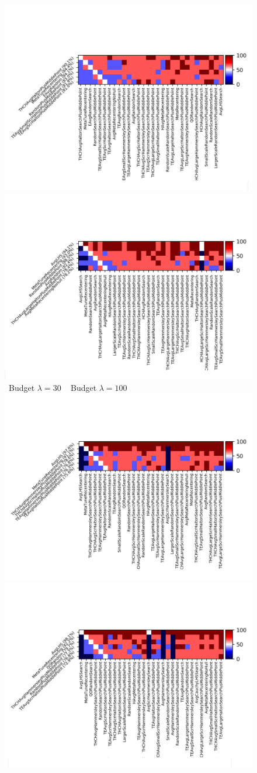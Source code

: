 %
\begin{figure}[t]
    \centering %
\includegraphics[trim={10 20 12 80}, clip,width=.48\textwidth]{sections/appendix/ppsn2020-rescaling/figures/fight_namesphere,budget30.png}
\includegraphics[trim={10 20 12 80}, clip,width=.48\textwidth]{sections/appendix/ppsn2020-rescaling/figures/fight_namesphere,budget100.png}\\
~\hfill Budget $\lambda=30$ \hfill ~ \hfill Budget $\lambda=100$ \hfill ~ \\
\includegraphics[trim={10 20 12 80}, clip,width=.48\textwidth]{sections/appendix/ppsn2020-rescaling/figures/fight_namesphere,budget3000.png}
\includegraphics[trim={10 20 12 80}, clip,width=.48\textwidth]{sections/appendix/ppsn2020-rescaling/figures/fight_namesphere,budget10000.png}\\

\end{figure}
